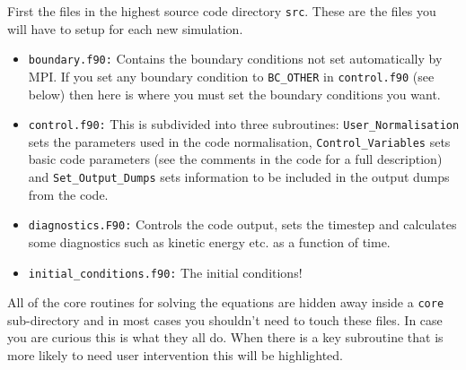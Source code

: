 \documentclass[11pt]{article}
\begin{document}
First the files in the highest source code directory \texttt{src}. These are the files you will have to setup for each new simulation.
\begin{itemize}
 \item{\texttt{boundary.f90:}} Contains the boundary conditions not set automatically by MPI. If you set any boundary condition to \texttt{BC\_OTHER} in \texttt{control.f90} (see below) then here is where you must set the boundary conditions you want. 
  \item{\texttt{control.f90:}} This is subdivided into three subroutines: \texttt{User\_Normalisation} sets the parameters used in the code normalisation, \texttt{Control\_Variables} sets basic code parameters  (see the comments in the code for a full description) and
\texttt{Set\_Output\_Dumps} sets information to be included in the output dumps from the code.
 \item{\texttt{diagnostics.F90:}} Controls the code output, sets the timestep and calculates some diagnostics such as kinetic energy etc. as a function of time.
  \item{\texttt{initial\_conditions.f90:}} The initial conditions! 
\end{itemize}
  
All of the core routines for solving the equations are hidden away inside a \texttt{core} sub-directory and in most cases you shouldn't need to touch these files. In case you are curious this is what they all do. When there is a key subroutine that is more likely to need user intervention this will be highlighted.  
  
\end{document}
